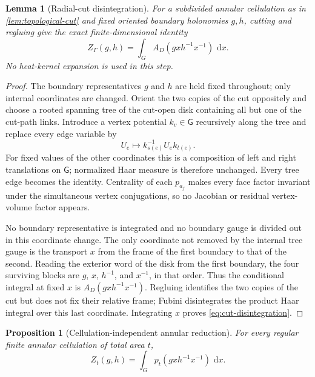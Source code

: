 \documentclass[11pt]{article}
\newtheorem{proposition}[theorem]{Proposition}
\newtheorem{lemma}[theorem]{Lemma}
\theoremstyle{remark}
\newcommand{\G}{\mathsf G}
\newcommand{\dd}{\,\mathrm d}
\begin{document}
\begin{lemma}[Radial-cut disintegration]\label{lem:cut-disintegration}
For a subdivided annular cellulation as in \cref{lem:topological-cut} and fixed
oriented boundary holonomies
$g,h$, cutting and regluing give the exact finite-dimensional identity
\begin{equation}\label{eq:cut-disintegration}
 Z_\Gamma(g,h)=\int_G A_D(gxh^{-1}x^{-1})\,\dd x.
\end{equation}
No heat-kernel expansion is used in this step.
\end{lemma}

\begin{proof}
The boundary representatives $g$ and $h$ are held fixed throughout; only
internal coordinates are changed.  Orient the two copies of the cut oppositely
and choose a rooted spanning tree
of the cut-open disk containing all but one of the cut-path links.  Introduce
a vertex potential $k_v\in\G$ recursively along the tree and replace every
edge variable by
\[
 U_e\longmapsto k_{s(e)}^{-1}U_e k_{t(e)}.
\]
For fixed values of the other coordinates this is a composition of left and
right translations on $\G$; normalized Haar measure is therefore unchanged.
Every tree edge becomes the identity.  Centrality of each $p_{a_f}$ makes every
face factor invariant under the simultaneous vertex conjugations, so no
Jacobian or residual vertex-volume factor appears.

No boundary representative is integrated and no boundary gauge is divided out
in this coordinate change.  The only coordinate not removed by the internal
tree gauge is the transport $x$ from
the frame of the first boundary to that of the second.  Reading the exterior
word of the disk from the first boundary, the four surviving blocks are
$g$, $x$, $h^{-1}$, and $x^{-1}$, in that order.  Thus the conditional integral
at fixed $x$ is $A_D(gxh^{-1}x^{-1})$.  Regluing identifies the two copies of
the cut but does not fix their relative frame; Fubini disintegrates the product
Haar integral over this last coordinate.  Integrating $x$ proves
\eqref{eq:cut-disintegration}.
\end{proof}

\begin{proposition}[Cellulation-independent annular reduction]\label{prop:cut-glue}
For every regular finite annular cellulation of total area $t$,
\begin{equation}\label{eq:orbit-heat}
 Z_t(g,h)=\int_G p_t(gxh^{-1}x^{-1})\,\dd x.
\end{equation}
\end{proposition}
\end{document}
